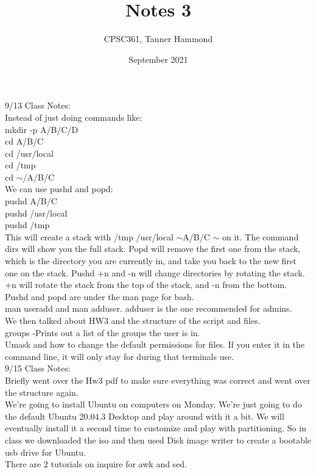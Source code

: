 \documentclass{article}
\title{Notes 3}
\author{CPSC361,
        Tanner Hammond}
\date{September 2021}
\begin{document}
\maketitle

9/13 Class Notes:\\
Instead of just doing commands like:\\
mkdir -p A/B/C/D\\
cd A/B/C\\
cd /usr/local\\
cd /tmp\\
cd $\sim$/A/B/C\\
We can use pushd and popd:\\
pushd  A/B/C\\
pushd /usr/local\\
pushd /tmp\\
This will create a stack with /tmp /usr/local $\sim$A/B/C $\sim$ on it. The command dirs will show you the full stack. Popd will remove the first one from the stack, which is the directory you are currently in, and take you back to the new first one on the stack. Pushd +n and -n will change directories by rotating the stack. +n will rotate the stack from the top of the stack, and -n from the bottom. Pushd and popd are under the man page for bash.\\

man useradd and man adduser. adduser is the one recommended for admins.\\

We then talked about HW3 and the structure of the script and files.\\

groups -Prints out a list of the groups the user is in.\\
Umask and how to change the default permissions for files. If you enter it in the command line, it will only stay for during that terminals use.\\

9/15 Class Notes:\\

Briefly went over the Hw3 pdf to make sure everything was correct and went over the structure again.\\

We're going to install Ubuntu on computers on Monday. We're just going to do the default Ubuntu 20.04.3 Desktop and play around with it a bit. We will eventually install it a second time to customize and play with partitioning. So in class we downloaded the iso and then used Disk image writer to create a bootable usb drive for Ubuntu.\\

There are 2 tutorials on inquire for awk and sed.
\end{document}
